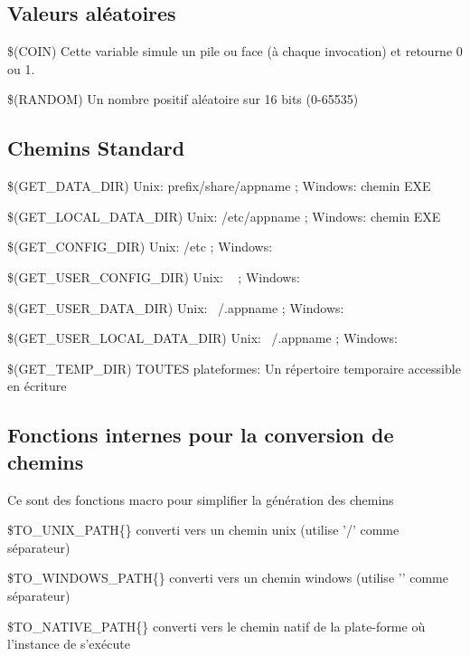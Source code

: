 \subsection{Valeurs aléatoires}

\begin{codeentry}
\item[\$(COIN)] Cette variable simule un pile ou face (à chaque invocation) et retourne 0 ou 1.
\item[\$(RANDOM)] Un nombre positif aléatoire sur 16 bits (0-65535)
\end{codeentry}

\subsection{Chemins Standard}

\begin{codeentry}
\item[\$(GET\_DATA\_DIR)] Unix: prefix/share/appname ; Windows: chemin EXE
\item[\$(GET\_LOCAL\_DATA\_DIR)] Unix: /etc/appname ; Windows: chemin EXE
\item[\$(GET\_CONFIG\_DIR)] Unix: /etc ; Windows: 
\item[\$(GET\_USER\_CONFIG\_DIR)] Unix: ~ ; Windows: 
\item[\$(GET\_USER\_DATA\_DIR)] Unix: ~/.appname ; Windows: 
\item[\$(GET\_USER\_LOCAL\_DATA\_DIR)] Unix: ~/.appname ; Windows: 
\item[\$(GET\_TEMP\_DIR)] TOUTES plateformes: Un répertoire temporaire accessible en écriture
\end{codeentry}

\subsection{Fonctions internes pour la conversion de chemins}
Ce sont des fonctions macro pour simplifier la génération des chemins 
\begin{codeentry}
\item[\$TO\_UNIX\_PATH\{\}] converti vers un chemin unix (utilise '/' comme séparateur)
\item[\$TO\_WINDOWS\_PATH\{\}] converti vers un chemin windows (utilise '\osp' comme séparateur)
\item[\$TO\_NATIVE\_PATH\{\}] converti vers le chemin natif de la plate-forme où l'instance de \codeblocks s'exécute
\end{codeentry}

